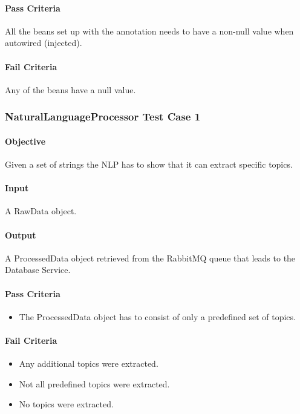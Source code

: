 \documentclass[hidelinks,english]{article}
\begin{document}
				\paragraph{Pass Criteria} All the beans set up with the \emph{\@Bean} annotation needs to have a non-null value when autowired (injected).
				\paragraph{Fail Criteria} Any of the beans have a null value.
				
			\subsubsection{NaturalLanguageProcessor Test Case 1}\label{pprocessortopictest1}
				\paragraph{Objective} Given a set of strings the NLP has to show that it can extract specific topics.
				\paragraph{Input} A RawData object.
				\paragraph{Output} A ProcessedData object retrieved from the RabbitMQ queue that leads to the Database Service.
				\paragraph{Pass Criteria}
				\begin{itemize}
					\item The ProcessedData object has to consist of only a predefined set of topics.
				\end{itemize}
				\paragraph{Fail Criteria}
				\begin{itemize}
					\item Any additional topics were extracted.
					\item Not all predefined topics were extracted.
					\item No topics were extracted.
				\end{itemize}
				
\end{document}
